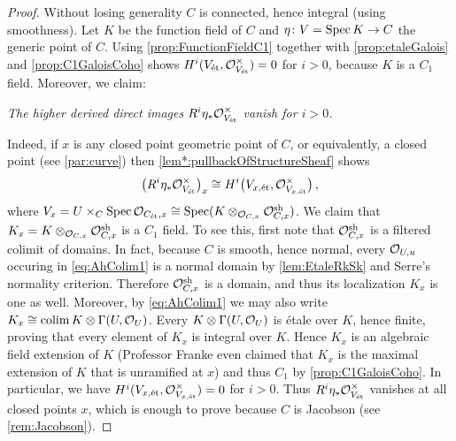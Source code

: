 \begin{proof}
	Without losing generality $C$ is connected, hence integral (using smoothness). Let $K$ be the function field of $C$ and $\eta\colon V=\Spec K\morphism C$ the generic point of $C$. Using \cref{prop:FunctionFieldC1} together with \cref{prop:etaleGalois} and \cref{prop:C1GaloisCoho} shows $H^i(V_{\mathrm{\acute{e}t}},\mathcal{O}_{V_{\mathrm{\acute{e}t}}}^\times)=0$ for $i>0$, because $K$ is a $C_1$ field. Moreover, we claim:
	\begin{alphanumerate}
		\item[\itememph{*}] \itshape The higher derived direct images $R^i\eta_*\mathcal{O}_{V_{\mathrm{\acute{e}t}}}^\times$ vanish for $i>0$.
	\end{alphanumerate}
	 Indeed, if $x$ is any closed point geometric point of $C$, or equivalently, a closed point (see \cref{par:curve}) then \cref{lem*:pullbackOfStructureSheaf} shows
	\begin{equation*}
		\big(R^i\eta_*\mathcal{O}_{V_{\mathrm{\acute{e}t}}}^\times\big)_x\cong H^i\big(V_{x,\mathrm{\acute{e}t}},\mathcal{O}_{V_{x,\mathrm{\acute{e}t}}}^\times\big)\,,
	\end{equation*}
	where $V_x= U\times_C\operatorname{Spec} \mathcal{O}_{C_{\mathrm{\acute{e}t}},x}\cong \operatorname{Spec} (K\otimes_{\mathcal{O}_{C,x}} \mathcal{O}_{C,x}^{\mathrm{sh}})$. We claim that $K_x= K\otimes_{\mathcal{O}_{C,x}} \mathcal{O}_{C,x}^{\mathrm{sh}}$ is a $C_1$ field. To see this, first note that $\mathcal{O}_{C,x}^{\mathrm{sh}}$ is a filtered colimit of domains. In fact, because $C$ is smooth, hence normal, every $\mathcal{O}_{U,u}$ occuring in \cref{eq:AhColim1} is a normal domain by \cref{lem:EtaleRkSk} and Serre's normality criterion. Therefore $\mathcal{O}_{C,x}^{\mathrm{sh}}$ is a domain, and thus its localization $K_x$ is one as well. Moreover, by \cref{eq:AhColim1} we may also write $K_x\cong \operatorname*{colim} K\otimes \operatorname{\Gamma}(U,\mathcal{O}_U)$. Every $K\otimes \operatorname{\Gamma}(U,\mathcal{O}_U)$ is étale over $K$, hence finite, proving that every element of $K_x$ is integral over $K$. Hence $K_x$ is an algebraic field extension of $K$ (Professor Franke even claimed that $K_x$ is the maximal extension of $K$ that is unramified at $x$) and thus $C_1$ by \cref{prop:C1GaloisCoho}. In particular, we have $H^i(V_{x,\mathrm{\acute{e}t}},\mathcal{O}_{V_{x,\mathrm{\acute{e}t}}}^\times)=0$ for $i>0$. Thus $R^i\eta_*\mathcal{O}_{V_{\mathrm{\acute{e}t}}}^\times$ vanishes at all closed points $x$, which is enough to prove \itememph{*} because $C$ is Jacobson (see \cref{rem:Jacobson}).
	

\end{proof}
